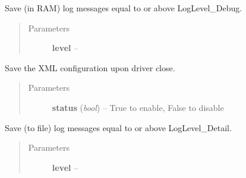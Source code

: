 \documentclass[letterpaper,10pt,english]{sphinxmanual}
\begin{document}
\begin{fulllineitems}
\begin{fulllineitems}
\begin{quote}
\begin{description}
\end{description}\end{quote}

\end{fulllineitems}


\begin{fulllineitems}
\label{option:openzwave.option.ZWaveOption.set_queue_log_level}
Save (in RAM) log messages equal to or above LogLevel\_Debug.
\begin{quote}\begin{description}
\item[{Parameters}] \leavevmode
\textbf{level} -- 

\end{description}\end{quote}

\end{fulllineitems}


\begin{fulllineitems}
\label{option:openzwave.option.ZWaveOption.set_save_configuration}
Save the XML configuration upon driver close.
\begin{quote}\begin{description}
\item[{Parameters}] \leavevmode
\textbf{status} (\emph{bool}) -- True to enable, False to disable

\end{description}\end{quote}

\end{fulllineitems}


\begin{fulllineitems}
\label{option:openzwave.option.ZWaveOption.set_save_log_level}
Save (to file) log messages equal to or above LogLevel\_Detail.
\begin{quote}\begin{description}
\item[{Parameters}] \leavevmode
\textbf{level} -- 


\end{description}
\end{quote}
\end{fulllineitems}
\end{fulllineitems}
\end{document}
